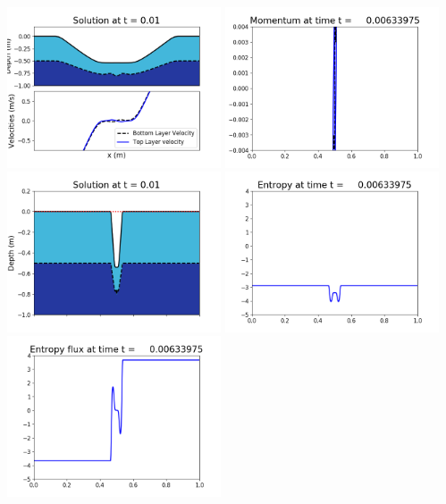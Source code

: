 \documentclass[11pt]{article}
\begin{document}
\includegraphics[width=0.475\textwidth]{frame0019fig1002.png}
\vskip 10pt 
\includegraphics[width=0.475\textwidth]{frame0019fig1003.png}
\includegraphics[width=0.475\textwidth]{frame0019fig1006.png}
\vskip 10pt 
\includegraphics[width=0.475\textwidth]{frame0019fig1007.png}
\includegraphics[width=0.475\textwidth]{frame0019fig1008.png}
\end{document}

